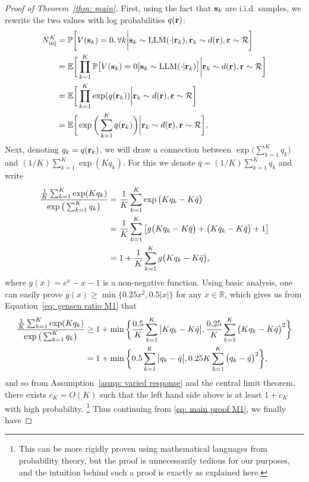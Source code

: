 \begin{proof} [Proof of Theorem~\ref{thm: main}]
First, using the fact that $\mathbf{s}_k$ are i.i.d. samples, we rewrite the two values with log probabilities $q(\mathbf{r})$: 
\begin{align}
N_{\text{inj}}^K &= \mathbb{P} \bigg[ V(\mathbf{s}_k) = 0, \forall k \bigg| \mathbf{s}_k \sim \text{LLM}(\cdot | \mathbf{r}_k), \mathbf{r}_k \sim d(\mathbf{r}), \mathbf{r} \sim \mathcal{R} \bigg] \notag \\
&= \mathbb{E} \bigg[ \prod_{k=1}^K \mathbb{P} \big[ V(\mathbf{s}_k) = 0 \big| \mathbf{s}_k \sim \text{LLM}(\cdot | \mathbf{r}_k) \big] \bigg| \mathbf{r}_k \sim d(\mathbf{r}), \mathbf{r} \sim \mathcal{R} \bigg] \notag \\
&= \mathbb{E} \bigg[ \prod_{k=1}^K \exp (q(\mathbf{r}_k)) \bigg| \mathbf{r}_k \sim d(\mathbf{r}), \mathbf{r} \sim \mathcal{R} \bigg] \notag \\
&= \mathbb{E} \bigg[ \exp \bigg( \sum_{k=1}^K q(\mathbf{r}_k) \bigg) \bigg| \mathbf{r}_k \sim d(\mathbf{r}), \mathbf{r} \sim \mathcal{R} \bigg], \label{eq: main proof M1}
\end{align}
Next, denoting $q_k = q(\mathbf{r}_k)$, we will draw a connection between $\exp \big( \sum_{k=1}^K q_k \big)$ and $(1/K) \sum_{k=1}^K \exp (Kq_k)$. For this we denote $\bar{q} = (1/K) \sum_{k=1}^K q_k$ and write
\begin{align}
\frac{\frac{1}{K} \sum_{k=1}^K \exp(Kq_k)} {\exp \big( \sum_{k=1} ^K q_k \big)} &= \frac{1}{K} \sum_{k=1} ^K \exp \big( Kq_k - K \bar{q} \big) \notag \\
&= \frac{1}{K} \sum_{k=1} ^K \big[ g \big( Kq_k - K \bar{q} \big) + \big( Kq_k - K \bar{q} \big) + 1 \big] \notag \\
&= 1 + \frac{1}{K} \sum_{k=1} ^K g \big( Kq_k - K \bar{q} \big), \label{eq: gensen ratio M1}
\end{align}
where $g(x) = e^x - x - 1$ is a non-negative function. Using basic analysis, one can easily prove $g(x) \geq \min \{ 0.25 x^2, 0.5 |x|\}$ for any $x \in \mathbb{R}$, which gives us from Equation~\ref{eq: gensen ratio M1} that
\begin{align}
\frac{\frac{1}{K} \sum_{k=1}^K \exp(Kq_k)} {\exp \big( \sum_{k=1} ^K q_k \big)} &\geq 1 + \min \bigg\{ \frac{0.5} {K} \sum_{k=1} ^K \big| Kq_k - K \bar{q} \big|, \frac{0.25} {K} \sum_{k=1} ^K \big( Kq_k - K \bar{q} \big)^2 \bigg\} \notag \\
&= 1 + \min \bigg\{ 0.5 \sum_{k=1} ^K \big| q_k - \bar{q} \big|, 0.25K \sum_{k=1} ^K \big( q_k - \bar{q} \big)^2 \bigg\}, \notag
\end{align}
and so from Assumption~\ref{asmp: varied response} and the central limit theorem, there exists $c_K = O(K)$ such that the left hand side above is at least $1 + c_K$ with high probability. \footnote{This can be more rigidly proven using mathematical languages from probability theory, but the proof is unnecessarily tedious for our purposes, and the intuition behind such a proof is exactly as explained here.} Thus continuing from \ref{eq: main proof M1}, we finally have

\end{proof}
